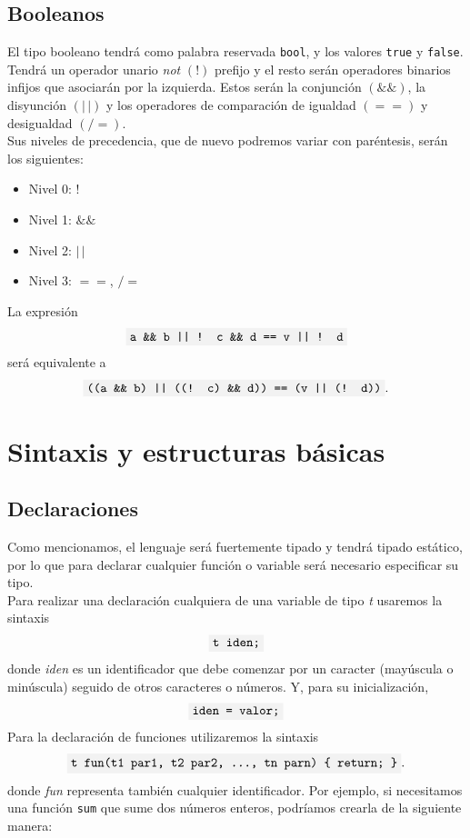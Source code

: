 \documentclass[10pt a4paper]{article}
\newcommand{\code}[1]{\colorbox{light-gray}{\texttt{#1}}}
\numberwithin{equation}{section}
\begin{document}
\subsection{Booleanos}
El tipo booleano tendrá como palabra reservada \code{bool}, y los valores \code{true} y \code{false}. Tendrá un operador unario \textit{not} $(!)$ prefijo y el resto serán operadores binarios infijos que asociarán por la izquierda. Estos serán la conjunción $(\&\&)$, la disyunción $(|\,|)$ y los operadores de comparación de igualdad $(==)$ y desigualdad $(/=)$. \\
\newline
Sus niveles de precedencia, que de nuevo podremos variar con paréntesis, serán los siguientes:
\begin{itemize}
    \item Nivel 0: $!$
    \item Nivel 1: $\&\&$
    \item Nivel 2: $|\,|$
    \item Nivel 3: $==$, $/=$
\end{itemize}
La expresión
\begin{equation*}
    \code{a \&\& b || ! c \&\& d == v || ! d}
\end{equation*}
será equivalente a
\begin{equation*}
    \code{((a \&\& b) || ((! c) \&\& d)) == (v || (! d))}.
\end{equation*}
\newline
\section{Sintaxis y estructuras básicas}
\subsection{Declaraciones}
Como mencionamos, el lenguaje será fuertemente tipado y tendrá tipado estático, por lo que para declarar cualquier función o variable será necesario especificar su tipo. \\
\newline
Para realizar una declaración cualquiera de una variable de tipo \textit{t} usaremos la sintaxis
\begin{equation*}
    \code{t iden;}
\end{equation*}
donde \textit{iden} es un identificador que debe comenzar por un caracter (mayúscula o minúscula) seguido de otros caracteres o números. Y, para su inicialización,
\begin{equation*}
    \code{iden = valor;}
\end{equation*}
\newline
Para la declaración de funciones utilizaremos la sintaxis 
\begin{equation*}
    \code{t fun(t1 par1, t2 par2, ..., tn parn) \{ return; \}}.
\end{equation*}
donde \textit{fun} representa también cualquier identificador. Por ejemplo, si necesitamos una función \code{sum} que sume dos números enteros, podríamos crearla de la siguiente manera:
\end{document}
